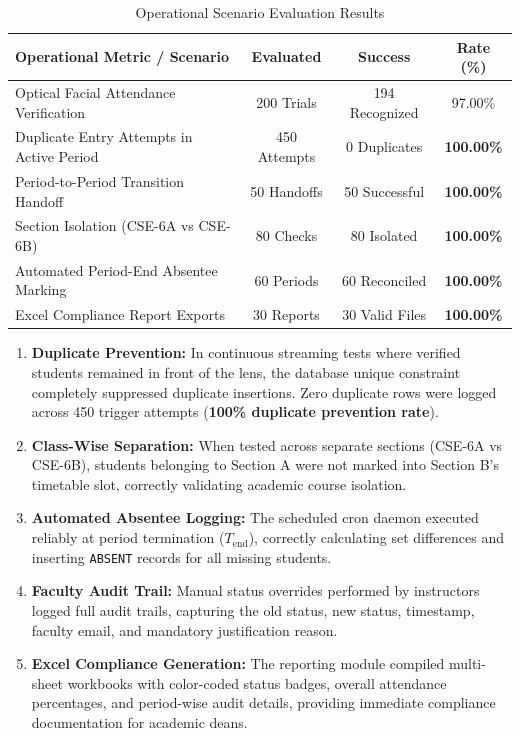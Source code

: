 \documentclass[conference]{IEEEtran}
\begin{document}
\begin{table}[htbp]
\caption{Operational Scenario Evaluation Results}
\begin{center}
\begin{tabular}{lccc}
\toprule
\textbf{Operational Metric / Scenario} & \textbf{Evaluated} & \textbf{Success} & \textbf{Rate (\%)} \\
\midrule
Optical Facial Attendance Verification & 200 Trials   & 194 Recognized & 97.00\% \\
Duplicate Entry Attempts in Active Period & 450 Attempts & 0 Duplicates   & \textbf{100.00\%} \\
Period-to-Period Transition Handoff     & 50 Handoffs  & 50 Successful  & \textbf{100.00\%} \\
Section Isolation (CSE-6A vs CSE-6B)    & 80 Checks    & 80 Isolated    & \textbf{100.00\%} \\
Automated Period-End Absentee Marking  & 60 Periods   & 60 Reconciled  & \textbf{100.00\%} \\
Excel Compliance Report Exports         & 30 Reports   & 30 Valid Files & \textbf{100.00\%} \\
\bottomrule
\end{tabular}
\end{center}
\end{table}

\begin{enumerate}
    \item \textbf{Duplicate Prevention:} In continuous streaming tests where verified students remained in front of the lens, the database unique constraint completely suppressed duplicate insertions. Zero duplicate rows were logged across 450 trigger attempts (\textbf{100\% duplicate prevention rate}).
    \item \textbf{Class-Wise Separation:} When tested across separate sections (CSE-6A vs CSE-6B), students belonging to Section A were not marked into Section B's timetable slot, correctly validating academic course isolation.
    \item \textbf{Automated Absentee Logging:} The scheduled cron daemon executed reliably at period termination ($T_{\text{end}}$), correctly calculating set differences and inserting \texttt{ABSENT} records for all missing students.
    \item \textbf{Faculty Audit Trail:} Manual status overrides performed by instructors logged full audit trails, capturing the old status, new status, timestamp, faculty email, and mandatory justification reason.
    \item \textbf{Excel Compliance Generation:} The reporting module compiled multi-sheet workbooks with color-coded status badges, overall attendance percentages, and period-wise audit details, providing immediate compliance documentation for academic deans.
\end{enumerate}
\end{document}
